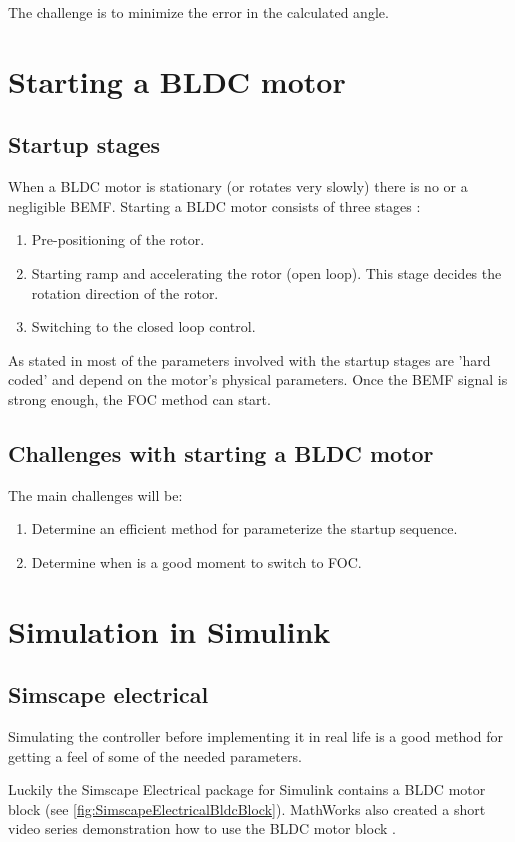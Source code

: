 \documentclass[]{report}
\begin{document}
The challenge is to minimize the error in the calculated angle. 

\section{Starting a BLDC motor}
\subsection{Startup stages}
When a BLDC motor is stationary (or rotates very slowly) there is no or a negligible BEMF. Starting a BLDC motor consists of three stages \cite{ST_Starting_Sequence_BLDC}:
\begin{enumerate}
	\item Pre-positioning of the rotor.
	\item Starting ramp and accelerating the rotor (open loop). This stage decides the rotation direction of the rotor.
	\item Switching to the closed loop control.
\end{enumerate}

As stated in \cite{ST_Starting_Sequence_BLDC} most of the parameters involved with the startup stages are 'hard coded' and depend on the motor's physical parameters. Once the BEMF signal is strong enough, the FOC method can start.

\subsection{Challenges with starting a BLDC motor}
The main challenges will be:
\begin{enumerate}
	\item Determine an efficient method for parameterize the startup sequence.
	\item Determine when is a good moment to switch to FOC.
\end{enumerate}

\section{Simulation in Simulink}
\subsection{Simscape electrical}
Simulating the controller before implementing it in real life is a good method for getting a feel of some of the needed parameters.

Luckily the Simscape Electrical package for Simulink contains a BLDC motor block \cite{SimscapeElectrical_BLDC} (see \autoref{fig:SimscapeElectricalBldcBlock}). MathWorks also created a short video series demonstration how to use the BLDC motor block \cite{SimscapeElectrical_BLDC_VideoSeries}. 
\end{document}
